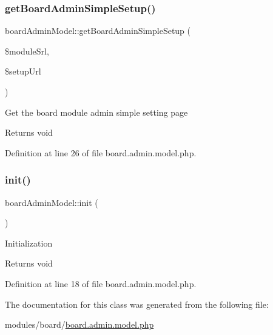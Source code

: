 \subsubsection{\texorpdfstring{get\+Board\+Admin\+Simple\+Setup()}{getBoardAdminSimpleSetup()}}
{\footnotesize\ttfamily board\+Admin\+Model\+::get\+Board\+Admin\+Simple\+Setup (\begin{DoxyParamCaption}\item[{}]{\$module\+Srl,  }\item[{}]{\$setup\+Url }\end{DoxyParamCaption})}

Get the board module admin simple setting page \begin{DoxyReturn}{Returns}
void 
\end{DoxyReturn}


Definition at line 26 of file board.\+admin.\+model.\+php.

\mbox{\label{classboardAdminModel_a93e03d7310fcdba8892e43de7fb532d0}} 
\subsubsection{\texorpdfstring{init()}{init()}}
{\footnotesize\ttfamily board\+Admin\+Model\+::init (\begin{DoxyParamCaption}{ }\end{DoxyParamCaption})}

Initialization \begin{DoxyReturn}{Returns}
void 
\end{DoxyReturn}


Definition at line 18 of file board.\+admin.\+model.\+php.



The documentation for this class was generated from the following file\+:\begin{DoxyCompactItemize}
\item 
modules/board/\hyperlink{board_8admin_8model_8php}{board.\+admin.\+model.\+php}\end{DoxyCompactItemize}
